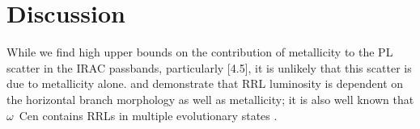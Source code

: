 \documentclass[a4paper,fleqn,usenatbib]{mnras}
\begin{document}

\section{Discussion}
\label{sec:discussion}

While we find high upper bounds on the contribution of metallicity to the PL scatter in the IRAC passbands, particularly [4.5], it is unlikely that this scatter is due to metallicity alone. \citet{1986A&A...169..111G} and \citet{1991ApJ...373L..43L} demonstrate that RRL luminosity is dependent on the horizontal branch morphology as well as metallicity; it is also well known that $\omega$~Cen contains RRLs in multiple evolutionary states \citep{2008MmSAI..79..342S, 2015A&A...577A..99N}.
\end{document}
